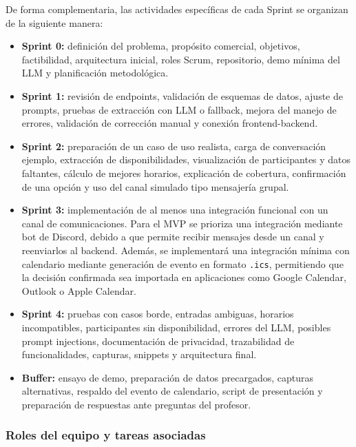 \FloatBarrier

De forma complementaria, las actividades específicas de cada Sprint se organizan de la siguiente manera:

\begin{itemize}
    \item \textbf{Sprint 0:} definición del problema, propósito comercial, objetivos, factibilidad, arquitectura inicial, roles Scrum, repositorio, demo mínima del LLM y planificación metodológica.

    \item \textbf{Sprint 1:} revisión de endpoints, validación de esquemas de datos, ajuste de prompts, pruebas de extracción con LLM o fallback, mejora del manejo de errores, validación de corrección manual y conexión frontend-backend.

    \item \textbf{Sprint 2:} preparación de un caso de uso realista, carga de conversación ejemplo, extracción de disponibilidades, visualización de participantes y datos faltantes, cálculo de mejores horarios, explicación de cobertura, confirmación de una opción y uso del canal simulado tipo mensajería grupal.

    \item \textbf{Sprint 3:} implementación de al menos una integración funcional con un canal de comunicaciones. Para el MVP se prioriza una integración mediante bot de Discord, debido a que permite recibir mensajes desde un canal y reenviarlos al backend. Además, se implementará una integración mínima con calendario mediante generación de evento en formato \texttt{.ics}, permitiendo que la decisión confirmada sea importada en aplicaciones como Google Calendar, Outlook o Apple Calendar.

    \item \textbf{Sprint 4:} pruebas con casos borde, entradas ambiguas, horarios incompatibles, participantes sin disponibilidad, errores del LLM, posibles prompt injections, documentación de privacidad, trazabilidad de funcionalidades, capturas, snippets y arquitectura final.

    \item \textbf{Buffer:} ensayo de demo, preparación de datos precargados, capturas alternativas, respaldo del evento de calendario, script de presentación y preparación de respuestas ante preguntas del profesor.
\end{itemize}

\subsubsection{Roles del equipo y tareas asociadas}

